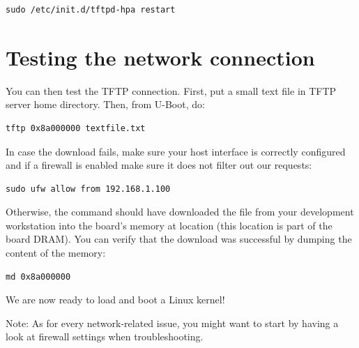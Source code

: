 \begin{verbatim}
sudo /etc/init.d/tftpd-hpa restart
\end{verbatim}

\section{Testing the network connection}

You can then test the TFTP connection. First, put a small text
file in TFTP server home directory. Then, from U-Boot, do:

\begin{verbatim}
tftp 0x8a000000 textfile.txt
\end{verbatim}

In case the download fails, make sure your host interface is correctly
configured and if a firewall is enabled make sure it does not filter out our
requests:
\begin{verbatim}
sudo ufw allow from 192.168.1.100
\end{verbatim}

Otherwise, the  command should have downloaded the
 file from your development workstation into the
board's memory at location  (this location is part of
the board DRAM). You can verify that the download was successful by
dumping the content of the memory:

\begin{verbatim}
md 0x8a000000
\end{verbatim}

We are now ready to load and boot a Linux kernel!

Note: As for every network-related issue, you might want to start by
having a look at firewall settings when troubleshooting.
